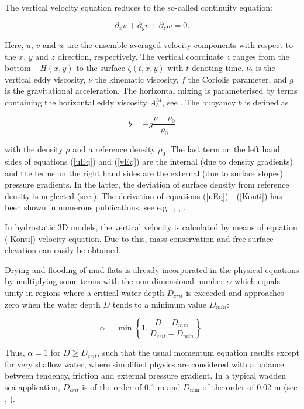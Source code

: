 The vertical velocity equation reduces to the so-called continuity equation:

\begin{equation}\label{Konti}
\partial_x u +\partial_y v +\partial_z w = 0.
\end{equation}


Here, $u$, $v$ and $w$ are the ensemble averaged
velocity components with respect
to the $x$, $y$ and $z$ direction, respectively.
The vertical coordinate $z$ ranges from the bottom $-H(x,y)$ \label{Hxy}
to the surface $\zeta(t,x,y)$ with $t$ denoting time.
$\nu_t$ is the vertical eddy viscosity, $\nu$ the kinematic viscosity,
$f$ the Coriolis
parameter, and $g$ is the gravitational acceleration.
The horizontal mixing is parameterised by terms containing the
horizontal eddy viscosity $A_h^M$, see \cite{BLUMBERGea87}.  
The buoyancy $b$ is defined as

\begin{equation}\label{bdef}
b=-g\frac{\rho-\rho_0}{\rho_0}
\end{equation}

with the density $\rho$ and a reference density $\rho_0$.
The last term on the left hand sides of equations (\ref{uEq}) and (\ref{vEq})
are the internal (due to density gradients)
and the terms on the right hand sides are the external
(due to surface slopes) pressure gradients. In the latter, the deviation of
surface density from reference density is neglected (see \cite{BURCHARDea97}).
The derivation of equations (\ref{uEq}) - (\ref{Konti}) has been shown in
numerous publications, see e.g.\ \cite{PEDLOSKY87}, \cite{HAIDVOGELea99},
\cite{BURCHARD02}.

In hydrostatic 3D models, the vertical velocity is calculated by means of
equation (\ref{Konti}) velocity equation. 
Due to this, mass conservation and free surface elevation
can easily be obtained.

Drying and flooding of mud-flats is already incorporated in
the physical equations by multiplying some terms with the
non-dimensional number $\alpha$ which equals unity in regions where a
critical water depth $D_{crit}$ is exceeded and approaches zero
when the water depth $D$ tends to a minimum value $D_{min}$:

\begin{equation}\label{alpha}
\alpha=\min\left\{1,\frac{D-D_{min}}{D_{crit}-D_{min}}\right\}.
\end{equation}

Thus, $\alpha=1$ for $D\geq D_{crit}$,  such that the usual momentum
equation results except for very shallow water, where simplified physics
are considered with a balance between tendency, friction and external pressure
gradient. In a typical wadden sea application, $D_{crit}$ is of the order
of 0.1 m and $D_{\min}$ of the order of 0.02 m (see \cite{BURCHARD98},
\cite{BURCHARDea03a}). 


